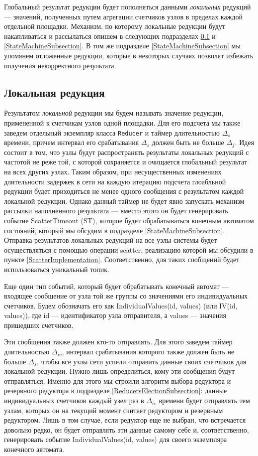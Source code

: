 \documentclass{article}
\theoremstyle{plain}
\theoremstyle{plain}
\theoremstyle{plain}
\theoremstyle{plain}
\theoremstyle{definition}
\theoremstyle{remark}
\theoremstyle{plain}
\begin{document}
Глобальный результат редукции будет пополняться данными \textit{локальных} редукций --- значений, полученных путем агрегации счетчиков узлов в пределах каждой отдельной площадки. Механизм, по которому локальные редукции будут накапливаться и рассылаться опишем в следующих подразделах \ref{LocalReductionsSubection} и \ref{StateMachineSubsection}. В том же подразделе \ref{StateMachineSubsection} мы упомянем отложенные редукции, которые в некоторых случаях позволят избежать получения некорректного результата.

\subsection{Локальная редукция}
\label{LocalReductionsSubection}

Результатом \textit{локальной} редукции мы будем называть значение редукции, примененной к счетчикам узлов одной площадки. Для его подсчета мы также заведем отдельный экземпляр класса \texttt{Reducer} и таймер длительностью $\Delta_s$ времени, причем интервал его срабатывания $\Delta_s$ должен быть не больше $\Delta_f$. Идея состоит в том, что узлы будут распространять результаты локальных редукций с частотой не реже той, с которой сохраняется и очищается глобальный результат на всех других узлах. Таким образом, при несущественных изменениях длительности задержек в сети на каждую итерацию подсчета глоабльной редукции будет приходиться не менее одного сообщения с результатом каждой локальной редукции. Однако данный таймер не будет явно запускать механизм рассылки наполненного результата --- вместо этого он будет генерировать событие ScatterTimeout (ST), которое будет обрабатываться конечным автоматом состояний, который мы обсудим в подразделе \ref{StateMachineSubsection}. Отправка результатов локальных редукций на все узлы системы будет осуществляться с помощью операции scatter, реализацию которой мы обсудили в пункте \ref{ScatterImplementation}. Соответственно, для таких сообщений будет использоваться уникальный топик.

Еще один тип событий, который будет обрабатывать конечный автомат --- входящее сообщение от узла той же группы со значениями его индивидуальных счетчиков. Будем обозначать его как IndividualValues(id, values) (или IV(id, values)), где id --- идентификатор узла отправителя, а values --- значения пришедших счетчиков.

Эти сообщения также должен кто-то отправлять. Для этого заведем таймер длительностью $\Delta_{iv}$, интервал срабатывания которого также должен быть не больше $\Delta_s$, чтобы все узлы сети успели отправить данные своих счетчиков для локальной редукции. Нужно лишь определиться, кому эти сообщения будут отправляться. Именно для этого мы строили алгоритм выбора редуктора и резервного редуктора в подразделе \ref{ReducersElectionSubsection}: данные индивидуальных счетчиков каждый узел раз в $\Delta_{iv}$ времени будет отправлять тем узлам, которых он на текущий момент считает редуктором и резервным редуктором. Лишь в том случае, если редуктор еще не выбран, что встречается довольно редко, он будет отправлять эти данные самому себе и, соответственно, генерировать событие IndividualValues(id, values) для своего экземпляра конечного автомата.
\end{document}
